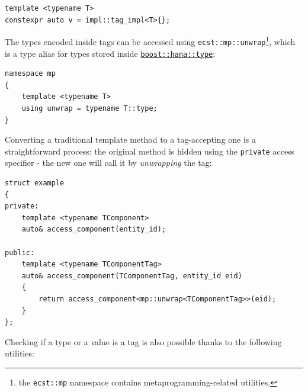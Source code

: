 \documentclass[twoside, 12pt, a4paper, openany]{book}
\begin{document}
\begin{verbatim}
template <typename T>
constexpr auto v = impl::tag_impl<T>{};
\end{verbatim}

The types encoded inside tags can be accessed using
\texttt{ecst::mp::unwrap}\footnote{the
  \texttt{ecst::mp}
  namespace contains metaprogramming-related utilities.}, which is a
type alias for types stored inside
\href{http://www.boost.org/doc/libs/1_61_0/libs/hana/doc/html/structboost_1_1hana_1_1type.html}{\texttt{boost::hana::type}}:

\begin{verbatim}
namespace mp
{
    template <typename T>
    using unwrap = typename T::type;
}
\end{verbatim}

Converting a traditional template method to a tag-accepting one is a
straightforward process: the original method is hidden using the
\texttt{private}
access specifier - the new one will call it by \emph{unwrapping} the
tag:

\begin{verbatim}
struct example
{
private:
    template <typename TComponent>
    auto& access_component(entity_id);

public:
    template <typename TComponentTag>
    auto& access_component(TComponentTag, entity_id eid)
    {
        return access_component<mp::unwrap<TComponentTag>>(eid);
    }
};
\end{verbatim}

Checking if a type or a value is a tag is also possible thanks to the
following utilities:
\end{document}
